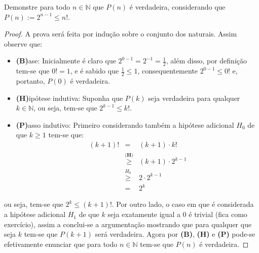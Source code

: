 \begin{exemplo}\label{exe:InducaoFraca2}
	Demonstre para todo $n \in \mathbb{N}$ que $P(n)$ é verdadeira, considerando que $P(n) := 2^{n-1} \leq n!$.
	
	\begin{proof}
		A prova será feita por indução sobre o conjunto dos naturais. Assim observe que:
		\begin{itemize}
			\item[ ] \textbf{(B)}ase: Inicialmente é claro que $2^{0 - 1} = 2^{-1} = \frac{1}{2}$, além disso, por definição tem-se que $0! = 1$, e é sabido que $\frac{1}{2} \leq 1$, consequentemente $2^{0 - 1} \leq 0!$ e, portanto, $P(0)$ é verdadeira.
			\item[ ] \textbf{(H)}ipótese indutiva: Suponha que $P(k)$ seja verdadeira para qualquer $k \in \mathbb{N}$, ou seja, tem-se que $2^{k-1} \leq k!$.
			\item[ ] \textbf{(P)}asso indutivo: Primeiro considerando também a hipótese adicional $H_0$ de que $k \geq 1$ tem-se que:
			\begin{eqnarray*}
				(k + 1)!  & = & (k+1) \cdot k!\\
				& \stackrel{\textbf{(H)}}{\geq} & (k+1) \cdot 2^{k-1}\\
				& \stackrel{H_0}{\geq} & 2 \cdot 2^{k-1}\\
				& = & 2^k
			\end{eqnarray*}
		\end{itemize}
		ou seja, tem-se que $2^k \leq (k+1)!$. Por outro lado, o caso em que é considerada a hipótese adicional $H_1$ de que $k$ seja exatamente igual a $0$ é trivial (fica como exercício), assim a conclui-se a argumentação mostrando que para qualquer que seja $k$ tem-se que $P(k+1)$ será verdadeira. Agora por  \textbf{(B)}, \textbf{(H)} e \textbf{(P)} pode-se efetivamente enunciar que  para todo $n \in \mathbb{N}$ tem-se que $P(n)$ é verdadeira.
	\end{proof}
\end{exemplo}

